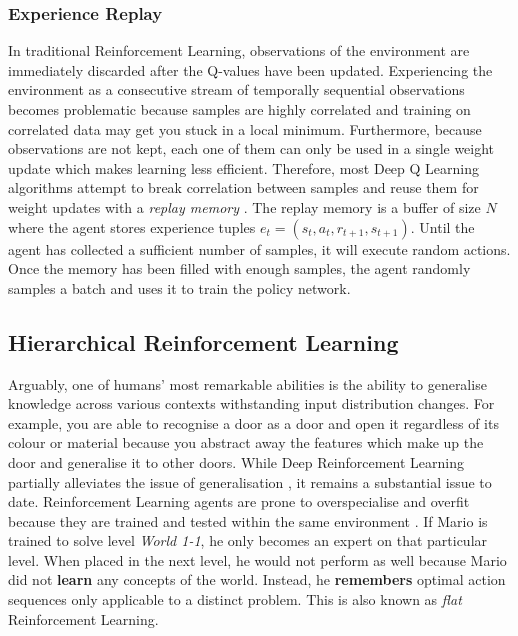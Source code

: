 \documentclass[notitlepage,a4paper,11pt]{article}
\begin{document}

\subsubsection{Experience Replay}
In traditional Reinforcement Learning, observations of the environment are immediately discarded after the Q-values have been updated. Experiencing the environment as a consecutive stream of temporally sequential observations becomes problematic because samples are highly correlated and training on correlated data may get you stuck in a local minimum. Furthermore, because observations are not kept, each one of them can only be used in a single weight update which makes learning less efficient. Therefore, most Deep Q Learning algorithms attempt to break correlation between samples and reuse them for weight updates with a \textit{replay memory} \cite{lin1993reinforcement}. The replay memory is a buffer of size $N$ where the agent stores experience tuples $e_t = (s_t, a_t, r_{t+1}, s_{t+1})$. Until the agent has collected a sufficient number of samples, it will execute random actions. Once the memory has been filled with enough samples, the agent randomly samples a batch and uses it to train the policy network. 


\subsection{Hierarchical Reinforcement Learning}
Arguably, one of humans' most remarkable abilities is the ability to generalise knowledge \cite{geirhos2018generalisation} across various contexts withstanding input distribution changes. For example, you are able to recognise a door as a door and open it regardless of its colour or material because you abstract away the features which make up the door and generalise it to other doors. While Deep Reinforcement Learning partially alleviates the issue of generalisation \cite{sutton1996generalization}, it remains a substantial issue \cite{van2017hybrid} to date. Reinforcement Learning agents are prone to overspecialise and overfit because they are trained and tested within the same environment \cite{cobbe2018quantifying}. If Mario is trained to solve level \textit{World 1-1}, he only becomes an expert on that particular level. When placed in the next level, he would not perform as well because Mario did not \textbf{learn} any concepts of the world. Instead, he \textbf{remembers} optimal action sequences only applicable to a distinct problem. This is also known as \textit{flat} Reinforcement Learning.
\end{document}
